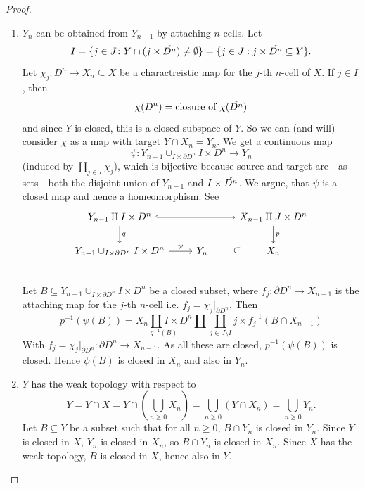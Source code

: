 \documentclass{TemplateLecture}
\begin{document}
\begin{proof}\leavevmode
    \begin{enumerate}
        \item \(Y_n\) can be obtained from \(Y_{n-1}\) by attaching \(n\)-cells.
        Let
        \[I = \{j \in J\colon Y \cap (j\times\mathring{D^n}) \neq \emptyset\} = \{j \in J : j\times \mathring{D^n} \subseteq Y\}.\]
        Let \(\chi_j \colon D^n \to X_n \subseteq X\) be a charactreistic map for the \(j\)-th \(n\)-cell of \(X\).
        If \(j \in I\), then
        \[\chi(D^n) = \text{closure of } \chi(\mathring{D^n})\]
        and since \(Y\) is closed, this is a closed subspace of \(Y\).
        So we can (and will) consider \(\chi\) as a map with target \(Y\cap X_n = Y_n\).
        We get a continuous map
        \[\psi \colon Y_{n-1} \cup_{I\times \partial D^n} I\times D^n \to Y_n\]
        (induced by \(\coprod_{j \in I} \chi_j\)),
        which is bijective because source and target are - as sets - both the disjoint union of \(Y_{n-1}\) and \(I \times \mathring{D^n}\). We argue, that \(\psi\) is a closed map and hence a homeomorphism. See
        \[\begin{tikzcd}
            Y_{n-1} \amalg I\times D^n \ar[rr, hook] \ar[d, "q"] & & X_{n-1} \amalg J\times D^n \ar[d, "p"]\\
            Y_{n-1} \cup_{I \times \partial D^n} I\times D^n \ar[r, "\psi"] & Y_n \ar[r, phantom, "\subseteq"] & X_n \\
        \end{tikzcd}\]
        Let \(B\subseteq Y_{n-1} \cup_{I\times \partial D^n} I\times D^n\) be a closed subset, where \(f_j \colon \partial D^n \to X_{n-1}\) is the attaching map for the \(j\)-th \(n\)-cell i.e. \(f_j = \chi_j\rvert_{\partial D^n}\). Then
        \[p^{-1}(\psi(B)) = \underset{q^{-1}(B)}{X_n \amalg I \times D^n} \amalg \coprod_{j \in J\setminus I} j\times f_j^{-1}(B \cap X_{n-1})\]
        With \(f_j = \chi_j \rvert_{\partial D^n} \colon \partial D^n \to X_{n-1}\). As all these are closed, \(p^{-1}(\psi(B))\) is closed. Hence \(\psi(B)\) is closed in \(X_n\) and also in \(Y_n\).

        \item \(Y\) has the weak topology with respect to
        \[Y = Y \cap X = Y \cap (\bigcup_{n \geq 0} X_n) = \bigcup_{n \geq 0} (Y \cap X_n) = \bigcup_{n \geq 0} Y_n.\]
        Let \(B \subseteq Y\) be a subset such that for all \(n \geq 0\), \(B\cap Y_n\) is closed in \(Y_n\). Since \(Y\) is closed in \(X\), \(Y_n\) is closed in \(X_n\), so \(B\cap Y_n\) is closed in \(X_n\). Since \(X\) has the weak topology, \(B\) is closed in \(X\), hence also in \(Y\).
    \end{enumerate}
\end{proof}
\end{document}
